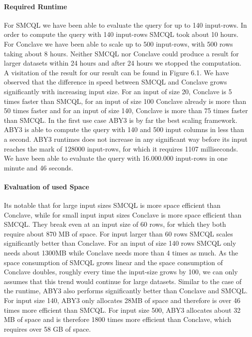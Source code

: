 \paragraph{Required Runtime}
For SMCQL we have been able to evaluate the query for up to 140 input-rows. In order to compute the query with 140 input-rows SMCQL took about 10 hours. For Conclave we have been able to scale up to 500 input-rows, with 500 rows taking about 8 hours. Neither SMCQL nor Conclave could produce a result for larger datasets within 24 hours and after 24 hours we stopped the computation. A visitation of the result for our result can be found in Figure 6.1.
We have observed that the difference in speed between SMCQL and Conclave grows significantly with increasing input size. For an input of size 20, Conclave is 5 times faster than SMCQL, for an input of size 100 Conclave already is more than 50 times faster and for an input of size 140, Conclave is more than 75 times faster than SMCQL. In the first use case ABY3 is by far the best scaling framework. ABY3 is able to compute the query with 140 and 500 input columns in less than a second. ABY3 runtimes does not increase in any significant way before its input reaches the mark of 128000 input-rows, for which it requires 1107 milliseconds. We have been able to evaluate the query with 16.000.000 input-rows in one minute and 46 seconds. 
\paragraph{Evaluation of used Space}
Its notable that for large input sizes SMCQL is more space efficient than Conclave, while for small input input sizes Conclave is more space efficient than SMCQL. They break even at an input size of 60 rows, for which they both require about 870 MB of space.  For input larger than 60 rows SMCQL scales significantly better than Conclave. For an input of size 140 rows SMCQL only needs about 1300MB while Conclave needs more than 4 times as much. As the space consumption of SMCQL grows linear and the space consumption of Conclave doubles, roughly every time the input-size grows by 100, we can only assumes that this trend would continue for large datasets. Similar to the case of the runtime, ABY3 also performs significantly better than Conclave and SMCQL. For input size 140, ABY3 only allocates 28MB of space and therefore is over 46 times more efficient than SMCQL. For input size 500, ABY3 allocates about 32 MB of space and is therefore 1800 times more efficient than Conclave, which requires over 58 GB of space.          

